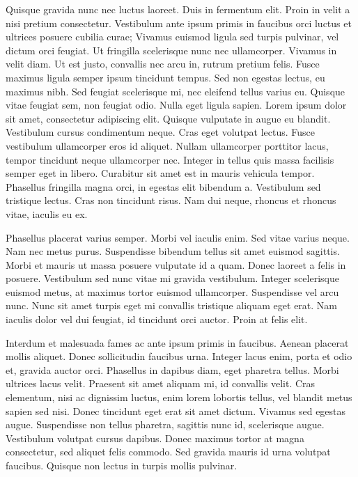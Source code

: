 \documentclass[10pt,landscape, a4paper]{article}
\begin{document}
\begin{multicols}{4}
Quisque gravida nunc nec luctus laoreet. Duis in fermentum elit. Proin in velit a nisi pretium consectetur. Vestibulum ante ipsum primis in faucibus orci luctus et ultrices posuere cubilia curae; Vivamus euismod ligula sed turpis pulvinar, vel dictum orci feugiat. Ut fringilla scelerisque nunc nec ullamcorper. Vivamus in velit diam. Ut est justo, convallis nec arcu in, rutrum pretium felis. Fusce maximus ligula semper ipsum tincidunt tempus. Sed non egestas lectus, eu maximus nibh. Sed feugiat scelerisque mi, nec eleifend tellus varius eu. Quisque vitae feugiat sem, non feugiat odio. Nulla eget ligula sapien.
Lorem ipsum dolor sit amet, consectetur adipiscing elit. Quisque vulputate in augue eu blandit. Vestibulum cursus condimentum neque. Cras eget volutpat lectus. Fusce vestibulum ullamcorper eros id aliquet. Nullam ullamcorper porttitor lacus, tempor tincidunt neque ullamcorper nec. Integer in tellus quis massa facilisis semper eget in libero. Curabitur sit amet est in mauris vehicula tempor. Phasellus fringilla magna orci, in egestas elit bibendum a. Vestibulum sed tristique lectus. Cras non tincidunt risus. Nam dui neque, rhoncus et rhoncus vitae, iaculis eu ex.

Phasellus placerat varius semper. Morbi vel iaculis enim. Sed vitae varius neque. Nam nec metus purus. Suspendisse bibendum tellus sit amet euismod sagittis. Morbi et mauris ut massa posuere vulputate id a quam. Donec laoreet a felis in posuere. Vestibulum sed nunc vitae mi gravida vestibulum. Integer scelerisque euismod metus, at maximus tortor euismod ullamcorper. Suspendisse vel arcu nunc. Nunc sit amet turpis eget mi convallis tristique aliquam eget erat. Nam iaculis dolor vel dui feugiat, id tincidunt orci auctor. Proin at felis elit.

Interdum et malesuada fames ac ante ipsum primis in faucibus. Aenean placerat mollis aliquet. Donec sollicitudin faucibus urna. Integer lacus enim, porta et odio et, gravida auctor orci. Phasellus in dapibus diam, eget pharetra tellus. Morbi ultrices lacus velit. Praesent sit amet aliquam mi, id convallis velit. Cras elementum, nisi ac dignissim luctus, enim lorem lobortis tellus, vel blandit metus sapien sed nisi. Donec tincidunt eget erat sit amet dictum. Vivamus sed egestas augue. Suspendisse non tellus pharetra, sagittis nunc id, scelerisque augue. Vestibulum volutpat cursus dapibus. Donec maximus tortor at magna consectetur, sed aliquet felis commodo. Sed gravida mauris id urna volutpat faucibus. Quisque non lectus in turpis mollis pulvinar.


\end{multicols}
\end{document}
